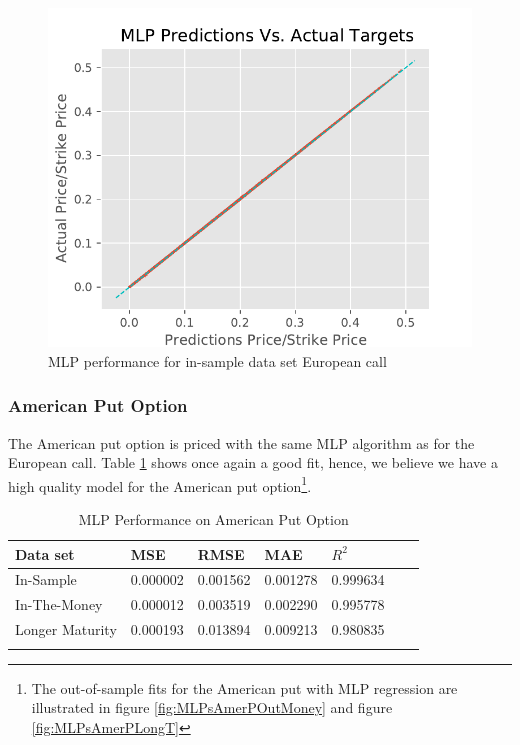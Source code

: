 \begin{figure}[th]
\centering
\includegraphics{Figures/PredictionEuroC.pdf}
\decoRule
\caption[MLP Performance for In-sample Data set European Call]{MLP performance for in-sample data set European call}
\label{fig:MLPInSampleEuroC}
\end{figure}


\subsubsection{American Put Option}
The American put option is priced with the same MLP algorithm as for the European call. Table \ref{tab:AmerPerformanceComparision} shows once again a good fit, hence, we believe we have a high quality model for the American put option\footnote{The out-of-sample fits for the American put with MLP regression are illustrated in figure \ref{fig:MLPsAmerPOutMoney} and figure \ref{fig:MLPsAmerPLongT}}.

\begin{table}[th]
\caption{MLP Performance on American Put Option}
\label{tab:AmerPerformanceComparision}
\centering
\begin{tabular}{l l l l l l l }
\toprule
\textbf{Data set} & \textbf{MSE} & \textbf{RMSE} & \textbf{MAE} & \textbf{$R^2$} \\
\midrule
In-Sample & 0.000002 & 0.001562 & 0.001278 & 0.999634\\
In-The-Money & 0.000012 & 0.003519 & 0.002290 & 0.995778\\
Longer Maturity & 0.000193 & 0.013894 & 0.009213 & 0.980835\\
\bottomrule\\
\end{tabular}
\end{table}

